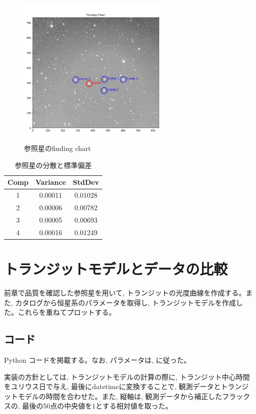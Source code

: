 \documentclass[dvipdfmx,a4paper]{jsarticle}
\begin{document}
\begin{figure}[H]
  \centering
  \includegraphics[width=0.65\textwidth]{./fig/finding_chart.png}
  \caption{参照星のfinding chart}
  \label{fig:finding_chart}
\end{figure}

\begin{table}[htbp]
  \centering
  \caption{参照星の分散と標準偏差}
  \label{tab:compstars}
  \begin{tabular}{c c c}
  \hline
  Comp & Variance & StdDev \\
  \hline
  1 & 0.00011 & 0.01028 \\
  2 & 0.00006 & 0.00782 \\
  3 & 0.00005 & 0.00693 \\
  4 & 0.00016 & 0.01249 \\
  \hline
  \end{tabular}
\end{table}

\section{トランジットモデルとデータの比較}
前章で品質を確認した参照星を用いて, トランジットの光度曲線を作成する。また, カタログから恒星系のパラメータを取得し, トランジットモデルを作成した。これらを重ねてプロットする。
\subsection{コード}

Python コードを掲載する。なお, パラメータは, \cite{Kabath2022}に従った。

実装の方針としては, トランジットモデルの計算の際に, トランジット中心時間をユリウス日で与え, 最後にdatetimeに変換することで, 観測データとトランジットモデルの時間を合わせた。また, 縦軸は, 観測データから補正したフラックスの, 最後の50点の中央値を1とする相対値を取った。

\end{document}
